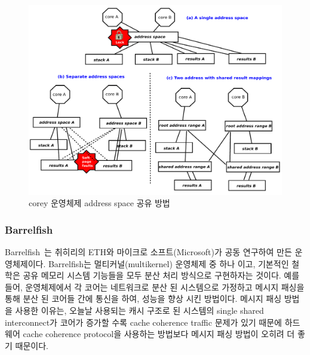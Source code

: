 \begin{figure}[h!]
    \centering
    \includegraphics[width=1\textwidth]{fig/corey/corey}
    \caption{corey 운영체제 address space 공유 방법}
  \label{fig:corey}
\end{figure}

\subsubsection{Barrelfish}


Barrelfish~\cite{Baumann2009Barrelfish}는 취히리의 ETH와 마이크로 소프트(Microsoft)가
공동 연구하여 만든 운영체제이다.
Barrelfish는 멀티커널(multikernel) 운영체제 중 하나 이고, 기본적인 철학은 공유 메모리 시스템 
기능들을 모두 분산 처리 방식으로 구현하자는 것이다.
예를 들어, 운영체제에서 각 코어는 네트워크로 분산 된 시스템으로 가정하고 메시지 패싱을 통해 분산 된 
코어들 간에 통신을 하여, 성능을 향상 시킨 방법이다. 
메시지 패싱 방법을 사용한 이유는, 오늘날 사용되는 캐시 구조로 된 시스템의 
single shared interconnect가 코어가 증가할 수록 cache coherence traffic 문제가 있기 때문에 하드웨어
cache coherence protocol을 사용하는 방법보다 메시지 패싱 방법이 오히려 더 좋기 때문이다. 



